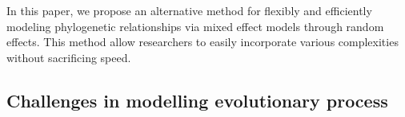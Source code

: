 \documentclass[12pt]{article}
\begin{document}
In this paper, we propose an alternative method for flexibly and efficiently modeling phylogenetic relationships via mixed effect models through random effects. 
This method allow researchers to easily incorporate various complexities without sacrificing speed.

\subsection*{Challenges in modelling evolutionary process}
\end{document}
